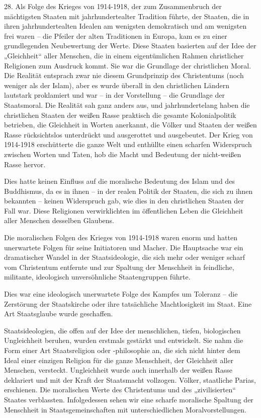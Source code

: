 \documentclass[11pt,a4paper]{book}
\begin{document}
28. Als Folge des Krieges von 1914-1918, der zum Zusammenbruch der mächtigsten Staaten mit jahrhundertealter Tradition führte, der Staaten, die in ihren jahrhundertealten Idealen am wenigsten demokratisch und am wenigsten frei waren -- die Pfeiler der alten Traditionen in Europa, kam es zu einer grundlegenden Neubewertung der Werte. Diese Staaten basierten auf der Idee der „Gleichheit“ aller Menschen, die in einem eigentümlichen Rahmen christlicher Religionen zum Ausdruck kommt. Sie war die Grundlage der christlichen Moral. Die Realität entsprach zwar nie diesem Grundprinzip des Christentums (noch weniger als der Islam), aber es wurde überall in den christlichen Ländern lautstark proklamiert und war -- in der Vorstellung -- die Grundlage der Staatsmoral. Die Realität sah ganz anders aus, und jahrhundertelang haben die christlichen Staaten der weißen Rasse praktisch die gesamte Kolonialpolitik betrieben, die Gleichheit in Worten anerkannt, die Völker und Staaten der weißen Rasse rücksichtslos unterdrückt und ausgerottet und ausgebeutet. Der Krieg von 1914-1918 erschütterte die ganze Welt und enthüllte einen scharfen Widerspruch zwischen Worten und Taten, hob die Macht und Bedeutung der nicht-weißen Rasse hervor. 

Dies hatte keinen Einfluss auf die moralische Bedeutung des Islam und des Buddhismus, da es in ihnen -- in der realen Politik der Staaten, die sich zu ihnen bekannten -- keinen Widerspruch gab, wie dies in den christlichen Staaten der Fall war. Diese Religionen verwirklichten im öffentlichen Leben die Gleichheit aller Menschen desselben Glaubens. 

Die moralischen Folgen des Krieges von 1914-1918 waren enorm und hatten unerwartete Folgen für seine Initiatoren und Macher. Die Hauptsache war ein dramatischer Wandel in der Staatsideologie, die sich mehr oder weniger scharf vom Christentum entfernte und zur Spaltung der Menschheit in feindliche, militante, ideologisch unversöhnliche Staatengruppen führte. 

Dies war eine ideologisch unerwartete Folge des Kampfes um Toleranz -- die Zerstörung der Staatskirche oder ihre tatsächliche Machtlosigkeit im Staat. Eine Art Staatsglaube wurde geschaffen. 

Staatsideologien, die offen auf der Idee der menschlichen, tiefen, biologischen Ungleichheit beruhen, wurden erstmals gestärkt und entwickelt. Sie nahm die Form einer Art Staatsreligion oder -philosophie an, die sich nicht hinter dem Ideal einer einzigen Religion für die ganze Menschheit, der Gleichheit aller Menschen, versteckt. Ungleichheit wurde auch innerhalb der weißen Rasse deklariert und mit der Kraft der Staatsmacht vollzogen. Völker, staatliche Parias, erschienen. Die moralischen Werte des Christentums und des „zivilisierten“ Staates verblassten. Infolgedessen sehen wir eine scharfe moralische Spaltung der Menschheit in Staatsgemeinschaften mit unterschiedlichen Moralvorstellungen. 
\end{document}
